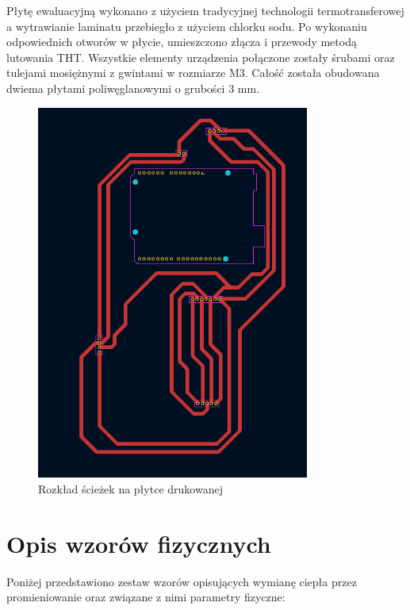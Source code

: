 \vspace{12pt}

Płytę ewaluacyjną wykonano z użyciem tradycyjnej technologii termotransferowej a wytrawianie laminatu przebiegło z użyciem chlorku sodu. Po wykonaniu odpowiednich otworów w płycie, umieszczono złącza i przewody metodą lutowania THT. Wszystkie elementy urządzenia połączone zostały śrubami oraz tulejami mosiężnymi z gwintami w rozmiarze M3. Całość została obudowana dwiema płytami poliwęglanowymi o grubości 3 mm.

\begin{figure}[h!]
    \centering
    \includegraphics[width=0.8\textwidth]{images/layout.png}
    \caption{Rozkład ścieżek na płytce drukowanej}
    \label{fig:twoj_obrazek}
\end{figure}

\chapter{Opis wzorów fizycznych}

Poniżej przedstawiono zestaw wzorów opisujących wymianę ciepła przez promieniowanie oraz związane z nimi parametry fizyczne:

